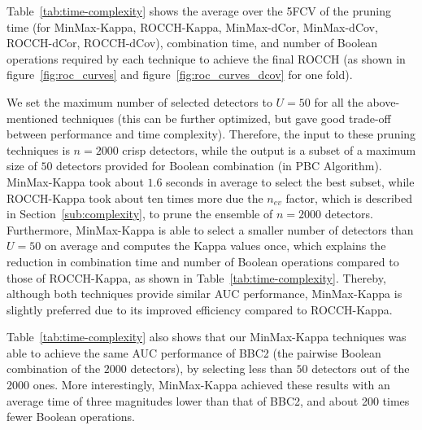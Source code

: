 Table~\ref{tab:time-complexity} shows the average over the 5FCV of the  pruning time (for MinMax-Kappa,  ROCCH-Kappa, MinMax-dCor, MinMax-dCov, ROCCH-dCor, ROCCH-dCov), combination time, and number of Boolean operations required by each technique to achieve the final ROCCH (as shown in  figure~\ref{fig:roc_curves} and  figure~\ref{fig:roc_curves_dcov} for one fold).  

We set the maximum number of selected detectors to $U=50$ for all the above-mentioned techniques (this can be further optimized, but gave good trade-off between performance and time complexity).
Therefore, the input to these pruning techniques is $n=2000$ crisp detectors, while the output is a subset of a maximum size of $50$ detectors provided for Boolean combination (in PBC Algorithm).
MinMax-Kappa took about $1.6$ seconds in average to select the best subset, while ROCCH-Kappa took about ten times more due the $n_{ev}$ factor, which is described in Section~\ref{sub:complexity}, to prune the ensemble of $n=2000$ detectors.
Furthermore, MinMax-Kappa is able to select a smaller number of detectors than $U=50$ on average and computes the Kappa values once, which explains the reduction in combination time and number of Boolean operations compared to those of ROCCH-Kappa, as shown in Table~\ref{tab:time-complexity}.
Thereby, although both techniques provide similar AUC performance, MinMax-Kappa is slightly preferred due to its improved efficiency  compared to ROCCH-Kappa.

Table~\ref{tab:time-complexity} also shows that our MinMax-Kappa techniques was able to achieve the same AUC performance of BBC2 (the pairwise Boolean combination of the $2000$ detectors), by selecting less than $50$ detectors out of the $2000$ ones.
More interestingly, MinMax-Kappa achieved these results with an average time of three magnitudes lower than that of BBC2, and about 200 times fewer Boolean operations.

